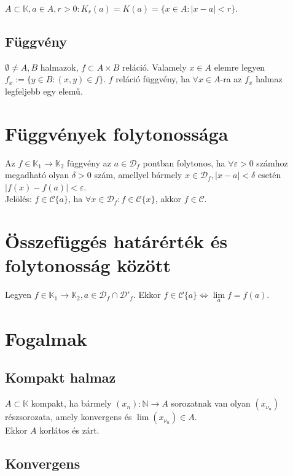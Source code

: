 \documentclass[margin=0px]{article}
\begin{document}
	$A \subset \mathbb{K}, a \in A, r > 0: K_{r}(a) = K(a) = \{x \in A: |x-a| < r\}$.
	
	\subsection{Függvény}
	
	$\emptyset \neq A, B$ halmazok, $f \subset A \times B$ reláció. Valamely $x \in A$ elemre legyen $f_{x} := \{y \in B: (x,y) \in f\}$. $f$ reláció függvény, ha $\forall x \in A$-ra az $f_{x}$ halmaz legfeljebb egy elemű.
	
	\section{Függvények folytonossága}
	
	Az $f \in \mathbb{K}_{1} \to \mathbb{K}_{2}$ függvény az $a \in \mathcal{D}_{f}$ pontban folytonos, ha $\forall \varepsilon > 0$ számhoz megadható olyan $\delta > 0$ szám, amellyel bármely $x \in \mathcal{D}_{f}, |x-a| < \delta$ esetén $|f(x)-f(a)| < \varepsilon$. \\
	Jelölés: $f \in \mathcal{C}\{a\}$, ha $\forall x \in \mathcal{D}_{f} : f \in \mathcal{C}\{x\}$, akkor $f \in \mathcal{C}$.
	
	\section{Összefüggés határérték és folytonosság között}
	
	Legyen $f \in \mathbb{K}_{1} \to \mathbb{K}_{2}, a \in \mathcal{D}_{f} \cap \mathcal{D}'_{f}$. Ekkor $f \in \mathcal{C}\{a\} \iff \lim\limits_{a}{f} = f(a)$.
	
	\section{Fogalmak}
	
	\subsection{Kompakt halmaz}
	
	$A \subset \mathbb{K}$ kompakt, ha bármely $(x_{n}): \mathbb{N} \to A$ sorozatnak van olyan $(x_{\nu_{n}})$ részsorozata, amely konvergens és $\lim{(x_{\nu_{n}})} \in A$. \\
	Ekkor $A$ korlátos és zárt.
	
	\subsection{Konvergens}
	
\end{document}
